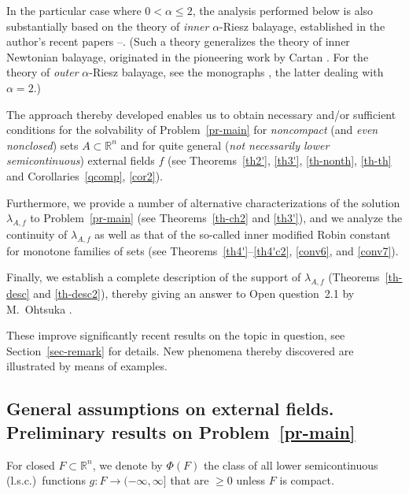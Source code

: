\documentclass[12pt,a4paper,reqno]{amsart} %
\theoremstyle{lause}
\theoremstyle{maaritelma}
\theoremstyle{lause}
\theoremstyle{maaritelma}
\numberwithin{equation}{section}
\begin{document}
In the particular case where $0<\alpha\leqslant2$, the analysis performed below is also substantially based on the theory of {\it inner} $\alpha$-Riesz balayage, established in the author's recent papers \cite{Z-bal}--\cite{Z-arx}. (Such a theory generalizes the theory of inner Newtonian balayage, originated in the pioneering work by Cartan \cite{Ca2}. For the theory of {\it outer} $\alpha$-Riesz balayage, see the monographs \cite{BH,Doob}, the latter dealing with $\alpha=2$.)

The approach thereby developed enables us to obtain necessary and/or sufficient conditions for the solvability of Problem~\ref{pr-main} for {\it noncompact} (and {\it even nonclosed\/}) sets $A\subset\mathbb R^n$ and for quite general ({\it not necessarily lower semicontinuous}) external fields $f$ (see Theorems~\ref{th2'}, \ref{th3'}, \ref{th-nonth}, \ref{th-th} and Corollaries~\ref{qcomp}, \ref{cor2}).

Furthermore, we provide a number of alternative characterizations of the solution $\lambda_{A,f}$ to Problem~\ref{pr-main} (see Theorems~\ref{th-ch2} and \ref{th3'}), and we analyze the continuity of $\lambda_{A,f}$ as well as that of the so-cal\-led inner modified Robin constant for monotone families of sets (see Theorems~\ref{th4'}--\ref{th4'c2}, \ref{conv6}, and \ref{conv7}).

Finally, we establish a complete description of the support of $\lambda_{A,f}$ (Theorems~\ref{th-desc} and \ref{th-desc2}),
thereby giving an answer to Open question~2.1 by M.~Ohtsuka \cite[p.~284]{O}.

These improve significantly recent results on the topic in question, see Section~\ref{sec-remark} for details. New phenomena thereby discovered are illustrated by means of examples.

\subsection{General assumptions on external fields. Preliminary results on Problem~\ref{pr-main}}\label{subs-prel} For closed $F\subset\mathbb R^n$, we denote by $\Phi(F)$ the class of all lower semicontinuous (l.s.c.)\ functions $g:F\to(-\infty,\infty]$ that
are ${}\geqslant0$ unless $F$ is compact.
\end{document}
